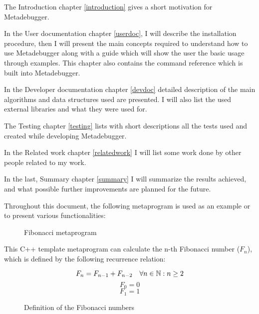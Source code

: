 The Introduction chapter \ref{introduction} gives a short motivation for
Metadebugger.

In the User documentation chapter \ref{userdoc}, I will describe the
installation procedure, then I will present the main concepts required to
understand how to use Metadebugger along with a guide which will show the user
the basic usage through examples. This chapter also contains the command
reference which is built into Metadebugger.

In the Developer documentation chapter \ref{devdoc} detailed description of the
main algorithms and data structures used are presented. I will also list the
used external libraries and what they were used for.

The Testing chapter \ref{testing} lists with short descriptions all the tests
used and created while developing Metadebugger.

In the Related work chapter \ref{relatedwork} I will list some work done by
other people related to my work.

In the last, Summary chapter \ref{summary} I will summarize the results
achieved, and what possible further improvements are planned for the future.

Throughout this document, the following metaprogram is used as an example or to
present various functionalities:

\begin{figure}[H]
    \caption{Fibonacci metaprogram}
\end{figure}

This C++ template metaprogram can calculate the n-th Fibonacci number
(\(F_n\)), which is defined by the following recurrence relation:

\begin{figure}[H]
    \[
        F_n = F_{n-1} + F_{n-2} \quad \forall n \in \mathbb{N}: n \geq 2 \\
    \]
    \[
        F_0 = 0
    \]
    \[
        F_1 = 1
    \]
    \caption{Definition of the Fibonacci numbers}
\end{figure}
